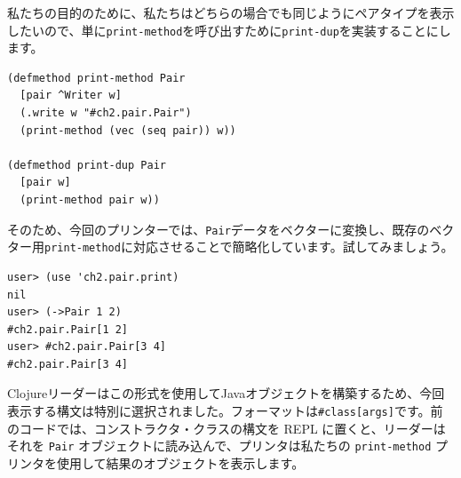 私たちの目的のために、私たちはどちらの場合でも同じようにペアタイプを表示したいので、単に\texttt{print-method}を呼び出すために\texttt{print-dup}を実装することにします。

\begin{lstlisting}[numbers=none]
(defmethod print-method Pair
  [pair ^Writer w]
  (.write w "#ch2.pair.Pair")
  (print-method (vec (seq pair)) w))

(defmethod print-dup Pair
  [pair w]
  (print-method pair w))
\end{lstlisting}

そのため、今回のプリンターでは、\texttt{Pair}データをベクターに変換し、既存のベクター用\texttt{print-method}に対応させることで簡略化しています。試してみましょう。

\begin{lstlisting}[numbers=none]
user> (use 'ch2.pair.print)
nil
user> (->Pair 1 2)
#ch2.pair.Pair[1 2]
user> #ch2.pair.Pair[3 4]
#ch2.pair.Pair[3 4]
\end{lstlisting}

Clojureリーダーはこの形式を使用してJavaオブジェクトを構築するため、今回表示する構文は特別に選択されました。フォーマットは\texttt{\#class[args]}です。前のコードでは、コンストラクタ・クラスの構文を REPL に置くと、リーダーはそれを \texttt{Pair} オブジェクトに読み込んで、プリンタは私たちの \texttt{print-method} プリンタを使用して結果のオブジェクトを表示します。

